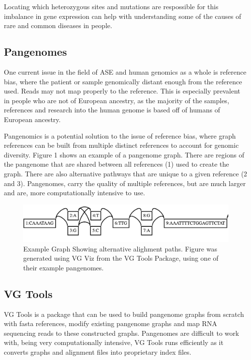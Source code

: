 \documentclass{article}
\begin{document}
Locating which heterozygous sites and mutations are respossible for this imbalance in gene expression 
can help with understanding some of the causes of rare and common diseases in people. \citep{Mohammadi_2019_Cold_Spring} 

\subsection{Pangenomes}

One current issue in the field of ASE and human genomics as a whole is reference bias, 
where the patient or sample genomically distant enough from the reference used. Reads may not map 
properly to the reference. This is especially prevalent in people who are not of European ancestry, 
as the majority of the samples, references and research into the human genome is based off of
humans of European ancestry. \citep{Chen_2021}  

Pangenomics is a potential solution to the issue of reference bias, where 
graph references can be built from multiple distinct references to account
for genomic diversity. Figure 1 shows an example of a pangenome graph. There are regions
of the pangenome that are shared between all references (1) used to create the graph. There are also
alternative pathways that are unique to a given reference (2 and 3). Pangenomes, carry the quality of 
multiple references, but are much larger and are, more computationally intensive to use.

\begin{figure}
  \centering
  \includegraphics[width=0.8\linewidth]{Example_Graph.png}
  \caption{Example Graph Showing alternative alighment paths.
  Figure was generated using VG Viz from the VG Tools Package, using one of their example pangenomes.}
\end{figure}

\subsection{VG Tools}

VG Tools is a package that can be used to build pangenome graphs from scratch with fasta references,
modify existing pangenome graphs and map RNA sequencing reads to these constructed 
graphs. Pangenomes are difficult to work with, being very computationally intensive, VG Tools runs
efficiently as it converts graphs and alignment files into proprietary index
files.
\end{document}
